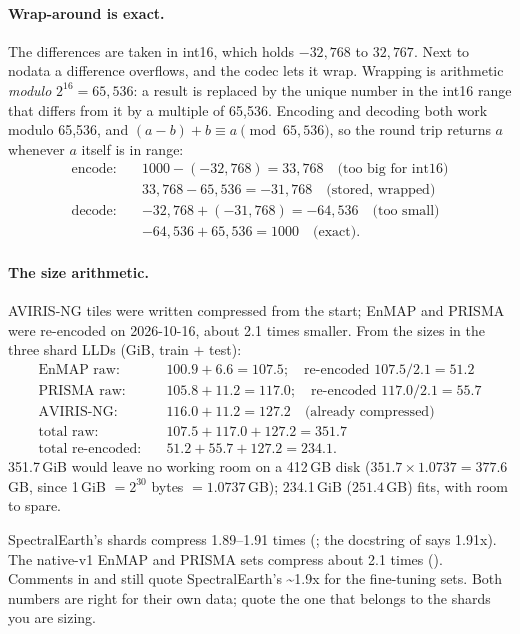 \paragraph{Wrap-around is exact.} The differences are taken in int16, which holds $-32{,}768$ to $32{,}767$. Next to nodata a
difference overflows, and the codec lets it wrap. Wrapping is arithmetic \emph{modulo} $2^{16} = 65{,}536$: a result is replaced
by the unique number in the int16 range that differs from it by a multiple of 65,536. Encoding and decoding both work modulo
65,536, and $(a - b) + b \equiv a \pmod{65{,}536}$, so the round trip returns $a$ whenever $a$ itself is in range:
\begin{align*}
  \text{encode:}\quad & 1000 - (-32{,}768) = 33{,}768 \quad\text{(too big for int16)}\\
  & 33{,}768 - 65{,}536 = -31{,}768 \quad\text{(stored, wrapped)}\\
  \text{decode:}\quad & -32{,}768 + (-31{,}768) = -64{,}536 \quad\text{(too small)}\\
  & -64{,}536 + 65{,}536 = 1000 \quad\text{(exact).}
\end{align*}

\paragraph{The size arithmetic.} AVIRIS-NG tiles were written compressed from the start; EnMAP and PRISMA were re-encoded on
2026-10-16, about 2.1 times smaller.\tbrk{} From the sizes in the three shard LLDs
(GiB, train $+$ test):
\begin{align*}
  \text{EnMAP raw:}&\quad 100.9 + 6.6 = 107.5; \quad\text{re-encoded } 107.5 / 2.1 = 51.2\\
  \text{PRISMA raw:}&\quad 105.8 + 11.2 = 117.0; \quad\text{re-encoded } 117.0 / 2.1 = 55.7\\
  \text{AVIRIS-NG:}&\quad 116.0 + 11.2 = 127.2 \quad\text{(already compressed)}\\
  \text{total raw:}&\quad 107.5 + 117.0 + 127.2 = 351.7\\
  \text{total re-encoded:}&\quad 51.2 + 55.7 + 127.2 = 234.1.
\end{align*}
351.7\,GiB would leave no working room on a 412\,GB disk ($351.7 \times 1.0737 = 377.6$\,GB, since 1\,GiB $= 2^{30}$ bytes $=
1.0737$\,GB); 234.1\,GiB ($251.4$\,GB) fits, with room to spare.

\begin{sourcenote}
SpectralEarth's shards compress 1.89--1.91 times (; the docstring of
 says 1.91x). The native-v1 EnMAP and PRISMA sets compress about 2.1 times
(). Comments in  and 
still quote SpectralEarth's \textasciitilde 1.9x for the fine-tuning sets. Both numbers are right for their own data; quote the one
that belongs to the shards you are sizing.
\end{sourcenote}

